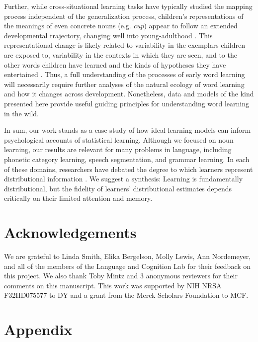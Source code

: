 \documentclass[authoryear,review]{elsarticle}
\begin{document}
Further, while cross-situational learning tasks have typically studied the mapping process independent of the generalization process, children's representations of the meanings of even concrete nouns (e.g. \emph{cup}) appear to follow an extended developmental trajectory, changing well into young-adulthood \citep{ameel2008}. This representational change is likely related to variability in the exemplars children are exposed to, variability in the contexts in which they are seen, and to the other words children have learned and the kinds of hypotheses they have entertained \citep{hidaka2010,Dautriche2014}. Thus, a full understanding of the processes of early word learning will necessarily require further analyses of the natural ecology of word learning and how it changes across development. Nonetheless, data and models of the kind presented here provide useful guiding principles for understanding word learning in the wild.

In sum, our work stands as a case study of how ideal learning models can inform psychological accounts of statistical learning. Although we focused on noun learning, our results are relevant for many problems in language, including phonetic category learning, speech segmentation, and grammar learning. In each of these domains, researchers have debated the degree to which learners represent distributional information \citep{Endress2005, Frank2010a, McMurray2013}. We suggest a synthesis: Learning is fundamentally distributional, but the fidelity of learners' distributional estimates depends critically on their limited attention and memory.

\section{Acknowledgements}
We are grateful to Linda Smith, Elika Bergelson, Molly Lewis, Ann Nordemeyer, and all of the members of the Language and Cognition Lab for their feedback on this project. We also thank Toby Mintz and 3 anonymous reviewers for their comments on this manuscript. This work was supported by NIH NRSA F32HD075577 to DY and a grant from the Merck Scholars Foundation to MCF.

\section{Appendix}

\renewcommand{\thetable}{A\arabic{table}}
\setcounter{table}{0}
\renewcommand{\thefigure}{A\arabic{figure}}
\setcounter{figure}{0}
\end{document}
